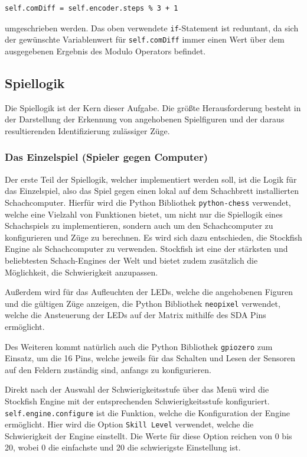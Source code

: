 \begin{scriptsize}
\begin{lstlisting}[captionpos=b, caption={Verkürzte Form der Abfrage}, label={lst:kurzabfrage}]
self.comDiff = self.encoder.steps % 3 + 1
\end{lstlisting}
\end{scriptsize}

umgeschrieben werden. Das oben verwendete \verb|if|-Statement ist reduntant, da sich der gewünschte Variablenwert für 
\verb|self.comDiff| immer einen Wert über dem ausgegebenen Ergebnis des Modulo Operators befindet.


\subsection{Spiellogik}
Die Spiellogik ist der Kern dieser Aufgabe. Die größte Herausforderung besteht in der Darstellung der Erkennung von 
angehobenen Spielfiguren und der daraus resultierenden Identifizierung zulässiger Züge. 


\subsubsection{Das Einzelspiel (Spieler gegen Computer)}
Der erste Teil der Spiellogik, welcher implementiert werden soll, ist die Logik für das Einzelspiel, also das Spiel 
gegen einen lokal auf dem Schachbrett installierten Schachcomputer. Hierfür wird die Python Bibliothek 
\verb|python-chess| verwendet, welche eine Vielzahl von Funktionen bietet, um nicht nur die Spiellogik eines 
Schachspiels zu implementieren, sondern auch um den Schachcomputer zu konfigurieren und Züge zu berechnen. Es wird 
sich dazu entschieden, die Stockfish Engine als Schachcomputer zu verwenden. Stockfish ist eine der stärksten und 
beliebtesten Schach-Engines der Welt und bietet zudem zusätzlich die Möglichkeit, die Schwierigkeit anzupassen.

Außerdem wird für das Aufleuchten der LEDs, welche die angehobenen Figuren und die gültigen Züge anzeigen, die Python 
Bibliothek \verb|neopixel| verwendet, welche die Ansteuerung der LEDs auf der Matrix mithilfe des SDA Pins 
ermöglicht.

Des Weiteren kommt natürlich auch die Python Bibliothek \verb|gpiozero| zum Einsatz, um die 16 Pins, welche 
jeweils für das Schalten und Lesen der Sensoren auf den Feldern zuständig sind, anfangs zu konfigurieren.

Direkt nach der Auswahl der Schwierigkeitsstufe über das Menü wird die Stockfish Engine mit der entsprechenden 
Schwierigkeitsstufe konfiguriert. \verb|self.engine.configure| ist die Funktion, welche die Konfiguration der Engine 
ermöglicht. Hier wird die Option \verb|Skill Level| verwendet, welche die Schwierigkeit der Engine einstellt. 
Die Werte für diese Option reichen von 0 bis 20, wobei 0 die einfachste und 20 die schwierigste Einstellung ist.\\


